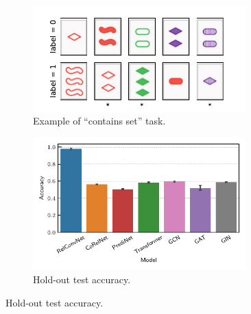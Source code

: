 \begin{figure}[ht]
    \vskip-10pt
    \centering
    \begin{subfigure}[b]{0.49\textwidth}
        \centering
        \includegraphics[width=0.9\textwidth]{figs/contains_set_example.pdf}
        \caption{Example of ``contains set'' task.}\label{fig:contains_set_example}
    \end{subfigure}
    \begin{subfigure}[b]{0.49\textwidth}
        \centering
        \includegraphics[width=0.9\textwidth]{figs/experiments/contains_set_acc.pdf}
        \vskip-5pt
        \caption{\footnotesize{Hold-out test accuracy.}}\label{fig:contains_set_acc}
    \end{subfigure}


\end{figure}
